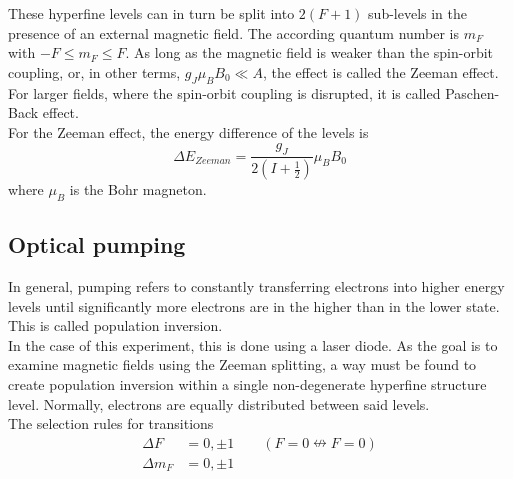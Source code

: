 These hyperfine levels can in turn be split into $2(F+1)$ sub-levels in the presence of an external magnetic field. The according quantum number is $m_F$ with $-F\le m_F\le F$. As long as the magnetic field is weaker than the spin-orbit coupling, or, in other terms, $g_J\mu_BB_0\ll A$, the effect is called the Zeeman effect. For larger fields, where the spin-orbit coupling is disrupted, it is called Paschen-Back effect.\\
For the Zeeman effect, the energy difference of the levels is
\begin{equation}
\Delta E_{Zeeman}=\frac{g_J}{2(I+\frac{1}{2})}\mu_BB_0
\label{eq:zeemanlevels}
\end{equation}
where $\mu_B$ is the Bohr magneton.

\subsection{Optical pumping}
In general, pumping refers to constantly transferring electrons into higher energy levels until significantly more electrons are in the higher than in the lower state. This is called population inversion.\\
In the case of this experiment, this is done using a laser diode. As the goal is to examine magnetic fields using the Zeeman splitting, a way must be found to create population inversion within a single non-degenerate hyperfine structure level. Normally, electrons are equally distributed between said levels.\\
The selection rules for transitions
\begin{equation}
\begin{aligned}
\Delta F&=0,\pm 1 \qquad (F=0\nleftrightarrow F=0)\\
\Delta m_F&=0,\pm 1
\end{aligned}
\end{equation}


